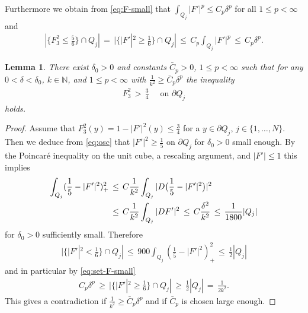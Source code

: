 \documentclass[reqno,makeidx,12pt]{amsart}
\theoremstyle{note}
\newtheorem{lemma}{Lemma}
\theoremstyle{definition}
\begin{document}
Furthermore we obtain from \eqref{eq:F-small} that $\int_{Q_j} |F'|^p \leq C_p \delta^p$ for all $1\leq p<\infty$ and
\begin{gather}
	|\big\{F_3^2\leq \frac{5}{6}\big\}\cap Q_j|\,=\, |\big\{|F'|^2 \geq \frac{1}{6}\big\}\cap Q_j|\,\leq\, C_p \int_{Q_j} |F'|^p\,\leq\, C_p\delta^p. \label{eq:set-F-small}
\end{gather}
\begin{lemma}\label{lem:bdryQ}
There exist $\delta_0>0$ and constants $\bar{C}_p>0$, $1\leq p<\infty$ such that for any $0<\delta<\delta_0$, $k\in{\ensuremath{\mathbb{N}}}$, and $1\leq p<\infty$ with $\frac{1}{k^2}\geq \bar{C}_p\delta^p$ the inequality
\begin{gather}
	F_3^2\,>\, \frac{3}{4}\quad\text{ on }\partial Q_j \label{eq:lembdryQ}
\end{gather}
holds.
\end{lemma}
\begin{proof}
Assume that $F_3^2(y)=1-|F'|^2(y)\leq \frac{3}{4}$ for a $y\in \partial Q_j$, $j\in \{1,\dots,N\}$. Then we deduce from \eqref{eq:osc} that $|F'|^2\geq \frac{1}{5}$ on $\partial Q_j$ for $\delta_0>0$ small enough. By the Poincar{\'e} inequality on the unit cube, a rescaling argument, and $|F'|\leq 1$ this implies
\begin{align}
	\int_{Q_j} (\frac{1}{5}-|F'|^2)_+^2 \,&\leq\, C\frac{1}{k^2}\int_{Q_j} | D\big(\frac{1}{5}-|F'|^2\big)|^2 \notag\\
	&\leq\, C \frac{1}{k^2} \int_{Q_j} |D F'|^2 \,\leq\, C\frac{\delta^2}{k^2}\,\leq\, \frac{1}{1800}|Q_j| \label{eq:intFsmall}
\end{align}
for $\delta_0>0$ sufficiently small.
Therefore
\begin{gather*}
	|\{|F'|^2 < \frac{1}{6}\}\cap Q_j|\,\leq\, 900 \int_{Q_j} (\frac{1}{5}-|F'|^2)_+^2 \,\leq\,  \frac{1}{2}|Q_j|
\end{gather*}
and in particular by \eqref{eq:set-F-small}
\begin{gather}
	C_p\delta^p \,\geq\, |\{|F'|^2 \geq \frac{1}{6}\}\cap Q_j|\,\geq\, \frac{1}{2}|Q_j|\,=\, \frac{1}{2k^2}. \label{eq:Fbig}
\end{gather}
This gives a contradiction if $\frac{1}{k^2}\geq \bar{C}_p\delta^p$ and if $\bar{C}_p$ is chosen large enough.
\end{proof}
\end{document}
